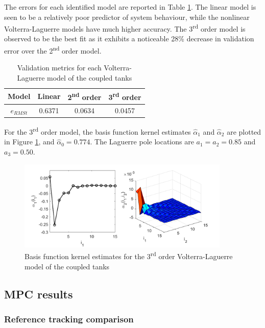 The errors for each identified model are reported in Table \ref{tab:CoupledTanksVal}. The linear model is seen to be a relatively poor predictor of system behaviour, while the nonlinear Volterra-Laguerre models have much higher accuracy. The 3\textsuperscript{rd} order model is observed to be the best fit as it exhibits a noticeable 28\% decrease in validation error over the 2\textsuperscript{nd} order model. 

\begin{table}[h]
\centering
\caption{Validation metrics for each Volterra-Laguerre model of the coupled tanks}
\begin{tabular}{|c||c|c|c|}
\hline
\textbf{Model} & Linear & 2\textsuperscript{nd} order & 3\textsuperscript{rd} order \\
\hline
\textbf{$e_{RMSt}$} & 0.6371 & 0.0634 & 0.0457 \\
\hline
\end{tabular}
\label{tab:CoupledTanksVal}
\end{table}

For the 3\textsuperscript{rd} order model, the basis function kernel estimates $\hat{\alpha}_1$ and $\hat{\alpha}_2$ are plotted in Figure \ref{fig:CoupledTanksKernels}, and $\hat{\alpha}_0 = 0.774$. The Laguerre pole locations are $a_1 = a_2 = 0.85$ and $a_3 = 0.50$.

\begin{figure}[h]
\centering
\includegraphics[width=0.9\textwidth]{Chapter11_ControlStudy/CoupledTanks3rdOrderKernels.pdf}
\caption{Basis function kernel estimates for the 3\textsuperscript{rd} order Volterra-Laguerre model of the coupled tanks}
\label{fig:CoupledTanksKernels}
\end{figure}

\subsection{MPC results}

\subsubsection{Reference tracking comparison}


